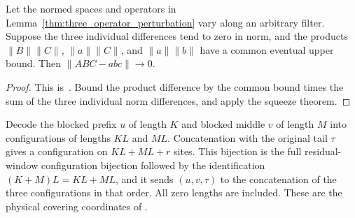 \begin{lemma}
    \label{thm:three_operator_perturbation_limit}
    \leanok
    Let the normed spaces and operators in Lemma~\ref{thm:three_operator_perturbation}
    vary along an arbitrary filter. Suppose the three individual differences
    tend to zero in norm, and the products $\|B\|\|C\|$, $\|a\|\|C\|$,
    and $\|a\|\|b\|$ have a common eventual upper bound.
    Then $\|ABC-abc\|\to0$.

\end{lemma}
\begin{proof}\leanok
    This is~\cite[``Vanishing three-operator
        perturbations'']{QICLean2026Blueprint}.
    Bound the product difference by the common bound times the sum of the
    three individual norm differences, and apply the squeeze theorem.
\end{proof}

\begin{definition}
    \label{def:residual_cover_coordinates}
    \leanok
    Decode the blocked prefix $u$ of length $K$ and blocked middle $v$
    of length $M$ into configurations of lengths $KL$ and $ML$.
    Concatenation with the original tail $\tau$ gives a configuration on
    $KL+ML+r$ sites. This bijection is the full residual-window configuration
    bijection followed by the identification $(K+M)L=KL+ML$, and it sends
    $(u,v,\tau)$ to the concatenation of the three configurations in that order.
    All zero lengths are included.
    These are the physical covering coordinates of
    \cite[Section~6]{Nachtergaele1996Spectral}.
\end{definition}

